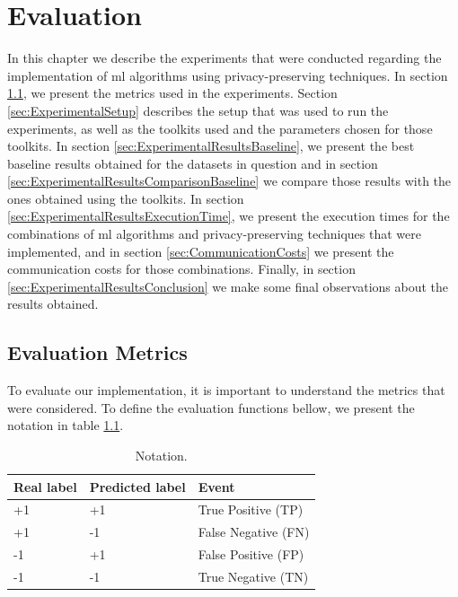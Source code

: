 %

\acresetall

\chapter{Evaluation}
\label{ch:Evaluation}

In this chapter we describe the experiments that were conducted regarding the implementation of \ac{ml} algorithms using privacy-preserving techniques. In section \ref{sec:EvaluationMetrics}, we present the metrics used in the experiments. Section \ref{sec:ExperimentalSetup} describes the setup that was used to run the experiments, as well as the toolkits used and the parameters chosen for those toolkits. In section \ref{sec:ExperimentalResultsBaseline}, we present the best baseline results obtained for the datasets in question and in section \ref{sec:ExperimentalResultsComparisonBaseline} we compare those results with the ones obtained using the toolkits. In section \ref{sec:ExperimentalResultsExecutionTime}, we present the execution times for the combinations of \ac{ml} algorithms and privacy-preserving techniques that were implemented, and in section \ref{sec:CommunicationCosts} we present the communication costs for those combinations. Finally, in section \ref{sec:ExperimentalResultsConclusion} we make some final observations about the results obtained.



\section{Evaluation Metrics}
\label{sec:EvaluationMetrics}

To evaluate our implementation, it is important to understand the metrics that were considered. To define the evaluation functions bellow, we present the notation in table \ref{table:notation}. 

\begin{table}[H]
\centering
\caption{Notation.}
\label{table:notation}
\begin{tabular}{|l|l|l|}
\hline
\textbf{Real label} & \textbf{Predicted label} & \textbf{Event} \\ \hline
 +1  &  +1  & True Positive (TP)   \\ \hline
 +1  &  -1  & False Negative (FN)  \\ \hline
 -1  &  +1  & False Positive (FP)  \\ \hline
 -1  &  -1  & True Negative (TN)   \\ \hline 
\end{tabular}
\end{table}

